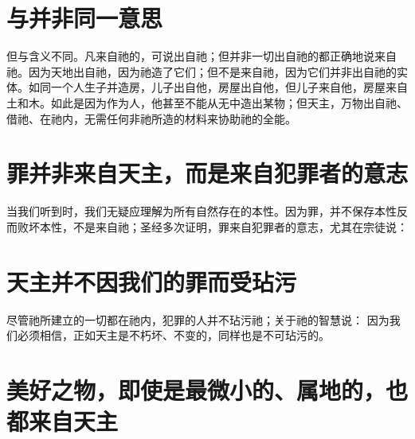 \section{与并非同一意思}

但与含义不同。凡来自祂的，可说出自祂；但并非一切出自祂的都正确地说来自祂。因为天地出自祂，因为祂造了它们；但不是来自祂，因为它们并非出自祂的实体。如同一个人生子并造房，儿子出自他，房屋出自他，但儿子来自他，房屋来自土和木。如此是因为作为人，他甚至不能从无中造出某物；但天主，万物出自祂、借祂、在祂内，无需任何非祂所造的材料来协助祂的全能。\par


\section{罪并非来自天主，而是来自犯罪者的意志}

当我们听到时，我们无疑应理解为所有自然存在的本性。因为罪，并不保存本性反而败坏本性，不是来自祂；圣经多次证明，罪来自犯罪者的意志，尤其在宗徒说：\par


\section{天主并不因我们的罪而受玷污}

尽管祂所建立的一切都在祂内，犯罪的人并不玷污祂；关于祂的智慧说： 因为我们必须相信，正如天主是不朽坏、不变的，同样也是不可玷污的。\par


\section{美好之物，即使是最微小的、属地的，也都来自天主}


